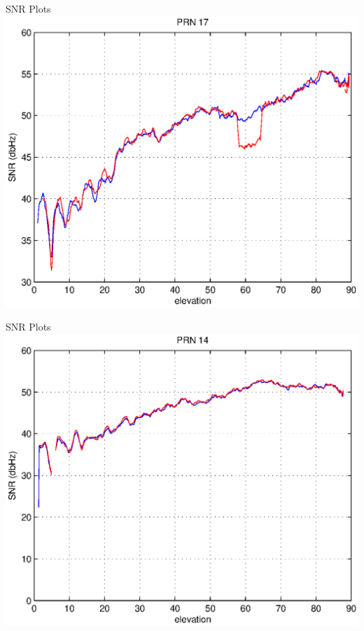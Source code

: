 \documentclass{beamer}
\begin{document}
\begin{frame}{SNR Plots}
  \includegraphics[width=1\linewidth]{img/snr_prn17_smth.eps}
\end{frame}
\begin{frame}{SNR Plots}
  \includegraphics[width=1\linewidth]{img/snr_prn14_smth.eps}
\end{frame}
\end{document}
